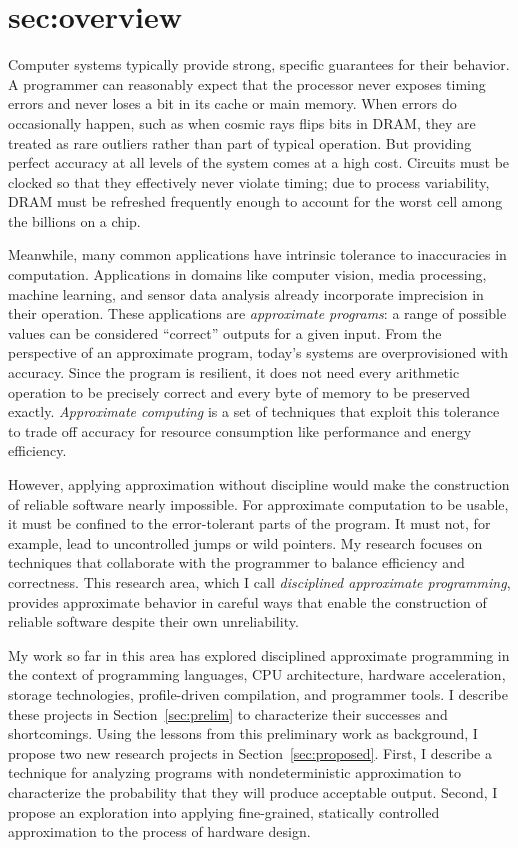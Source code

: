 \section{sec:overview}

Computer systems typically provide strong, specific guarantees for their behavior. A
programmer can reasonably expect that the processor never exposes timing
errors and never loses a bit in its cache or main memory. When errors do
occasionally happen, such as when cosmic rays flips bits in DRAM, they are
treated as rare outliers rather than part of typical operation.
But providing perfect accuracy at all levels of the system comes at a high
cost. Circuits must be clocked so that they effectively never violate timing;
due to process variability, DRAM must be refreshed frequently enough to
account for the worst cell among the billions on a chip.

Meanwhile, many common applications have intrinsic tolerance to inaccuracies
in computation. Applications in domains like computer vision, media
processing, machine learning, and sensor data analysis already incorporate
imprecision in their operation. These applications are \emph{approximate
programs}: a range of possible values can be considered ``correct'' outputs
for a given input. From the perspective of an approximate program, today's
systems are overprovisioned with accuracy. Since the program is resilient, it
does
not need every arithmetic operation to be precisely correct and every byte of memory to be preserved
exactly. \emph{Approximate computing} is a set of techniques that exploit this
tolerance to trade off accuracy for resource consumption like performance and
energy efficiency.

However, applying approximation without discipline would make the construction
of reliable software nearly impossible. For approximate computation to be
usable, it must be confined to the error-tolerant parts of the program.  It
must not, for example, lead to uncontrolled jumps or wild pointers. My
research focuses on techniques that collaborate with the programmer to balance
efficiency and correctness. This research area, which I call \emph{disciplined
approximate programming}, provides approximate behavior in careful ways that
enable the construction of reliable software despite their own unreliability.

My work so far in this area has explored disciplined approximate programming
in the context of programming languages, CPU architecture, hardware
acceleration, storage technologies, profile-driven compilation, and programmer
tools. I describe these projects in Section~\ref{sec:prelim} to characterize
their successes and shortcomings. Using the lessons from this preliminary work
as background, I propose two new research projects in
Section~\ref{sec:proposed}. First, I describe a technique for analyzing
programs with nondeterministic approximation to characterize the probability
that they will produce acceptable output. Second, I propose an exploration
into applying fine-grained, statically controlled approximation to the process
of hardware design.


